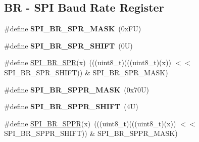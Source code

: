 \subsection*{BR -\/ S\+PI Baud Rate Register}
\begin{DoxyCompactItemize}
\item 
\mbox{\label{group___s_p_i___register___masks_gaac7263560f1cc81f8f3fb6a7089d5c26}} 
\#define {\bfseries S\+P\+I\+\_\+\+B\+R\+\_\+\+S\+P\+R\+\_\+\+M\+A\+SK}~(0x\+F\+U)
\item 
\mbox{\label{group___s_p_i___register___masks_ga49ebd0e5e9751438bc3968877baf2661}} 
\#define {\bfseries S\+P\+I\+\_\+\+B\+R\+\_\+\+S\+P\+R\+\_\+\+S\+H\+I\+FT}~(0\+U)
\item 
\#define \mbox{\hyperlink{group___s_p_i___register___masks_ga3fc6dbcc300be115c0e5d1dbc99946a2}{S\+P\+I\+\_\+\+B\+R\+\_\+\+S\+PR}}(x)~(((uint8\+\_\+t)(((uint8\+\_\+t)(x)) $<$$<$ S\+P\+I\+\_\+\+B\+R\+\_\+\+S\+P\+R\+\_\+\+S\+H\+I\+FT)) \& S\+P\+I\+\_\+\+B\+R\+\_\+\+S\+P\+R\+\_\+\+M\+A\+SK)
\item 
\mbox{\label{group___s_p_i___register___masks_gaf3ca4981d609aac2f31d89c677192f7a}} 
\#define {\bfseries S\+P\+I\+\_\+\+B\+R\+\_\+\+S\+P\+P\+R\+\_\+\+M\+A\+SK}~(0x70\+U)
\item 
\mbox{\label{group___s_p_i___register___masks_gac53e7d34efb934fe3232632a77301ca3}} 
\#define {\bfseries S\+P\+I\+\_\+\+B\+R\+\_\+\+S\+P\+P\+R\+\_\+\+S\+H\+I\+FT}~(4\+U)
\item 
\#define \mbox{\hyperlink{group___s_p_i___register___masks_gafa708f7ca2a25aa8021d443cc060f64a}{S\+P\+I\+\_\+\+B\+R\+\_\+\+S\+P\+PR}}(x)~(((uint8\+\_\+t)(((uint8\+\_\+t)(x)) $<$$<$ S\+P\+I\+\_\+\+B\+R\+\_\+\+S\+P\+P\+R\+\_\+\+S\+H\+I\+FT)) \& S\+P\+I\+\_\+\+B\+R\+\_\+\+S\+P\+P\+R\+\_\+\+M\+A\+SK)
\end{DoxyCompactItemize}
